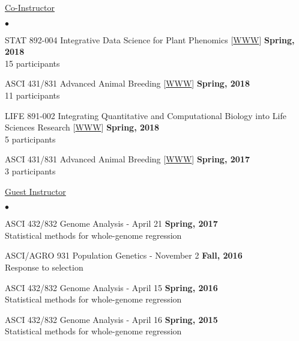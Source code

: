 \documentclass[margin,line,10pt]{res}
\newenvironment{list2}{
  \begin{list}{$\bullet$}{%
      \setlength{\itemsep}{0in}
      \setlength{\parsep}{0in} \setlength{\parskip}{0in}
      \setlength{\topsep}{0in} \setlength{\partopsep}{0in} 
      \setlength{\leftmargin}{0.2in}}}{\end{list}}
\begin{document}
\begin{resume}
\underline{Co-Instructor} 
\vspace{0.4cm}
\begin{list2}
  
\item STAT 892-004 Integrative Data Science for Plant Phenomics [\textcolor{blue}{\href{http://morotalab.org/stat892-2018/STAT892.html}{WWW}}]
  \hfill {\bf Spring, 2018} \\
  15 participants 

\vspace{0.5cm}
  
\item ASCI 431/831 Advanced Animal Breeding [\textcolor{blue}{\href{http://morotalab.org/asci431-2018/ASCI431-831.html}{WWW}}]
  \hfill {\bf Spring, 2018} \\
  11 participants 

  \vspace{0.5cm}

\item LIFE 891-002 Integrating Quantitative and Computational Biology into Life Sciences Research [\textcolor{blue}{\href{http://morotalab.org/life431-2018/life431-831.html}{WWW}}]
  \hfill {\bf Spring, 2018}  \\
 5 participants  

 \vspace{0.5cm}

\item ASCI 431/831 Advanced Animal Breeding [\textcolor{blue}{\href{http://morotalab.org/asci431-2017/ASCI431-831.html}{WWW}}]
  \hfill {\bf Spring, 2017}  \\
 3 participants 
\end{list2}

 \vspace{.01pt}

\underline{Guest Instructor}
 \vspace{0.4cm}
 \begin{list2}
 \item ASCI 432/832 Genome Analysis - April 21  \hfill {\bf Spring, 2017} \\
   Statistical methods for whole-genome regression
\vspace{0.5cm}
\item ASCI/AGRO 931  Population Genetics - November 2  \hfill {\bf Fall, 2016} \\
  Response to selection
\vspace{0.5cm}
\item ASCI 432/832 Genome Analysis - April 15  \hfill {\bf Spring, 2016} \\
  Statistical methods for whole-genome regression
\vspace{0.5cm}
\item ASCI 432/832 Genome Analysis - April 16    \hfill {\bf Spring, 2015} \\
  Statistical methods for whole-genome regression
\end{list2}



\end{resume}
\end{document}

